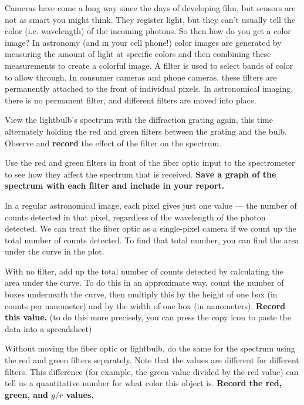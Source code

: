 Cameras have come a long way since the days of developing film, but sensors are not as smart you might think. They register light, but they can't usually tell the color (i.e. wavelength) of the incoming photons. So then how do you get a color image? In astronomy (and in your cell phone!) color images are generated by measuring the amount of light at specific colors and then combining these measurements to create a colorful image. A filter is used to select bands of color to allow through. In consumer cameras and phone cameras, these filters are permanently attached to the front of individual pixels. In astronomical imaging, there is no permanent filter, and different filters are moved into place.

\begin{steps}
	\item\label{ic:it:filteffect1} View the lightbulb's spectrum with the diffraction grating again, this time alternately holding the red and green filters between the grating and the bulb. Observe and \textbf{record} the effect of the filter on the spectrum.
	
	\item\label{ic:it:filteffect2} Use the red and green filters in front of the fiber optic input to the spectrometer to see how they affect the spectrum that is received. \textbf{Save a graph of the spectrum with each filter and include in your report.}
\end{steps}

In a regular astronomical image, each pixel gives just one value --- the number of counts detected in that pixel, regardless of the wavelength of the photon detected. We can treat the fiber optic as a single-pixel camera if we count up the total number of counts detected. To find that total number, you can find the area under the curve in the plot.

\begin{steps}
	\item\label{ic:it:intens1} With no filter, add up the total number of counts detected by calculating the area under the curve. To do this in an approximate way, count the number of boxes underneath the curve, then multiply this by the height of one box (in counts per nanometer) and by the width of one box (in nanometers). \textbf{Record this value.} (to do this more precisely, you can press the copy icon to paste the data into a spreadsheet)
	
	\item\label{ic:it:intens2} Without moving the fiber optic or lightbulb, do the same for the spectrum using the red and green filters separately. Note that the values are different for different filters. This difference (for example, the green value divided by the red value) can tell us a quantitative number for what color this object is. \textbf{Record the red, green, and $g/r$ values.}
\end{steps}


